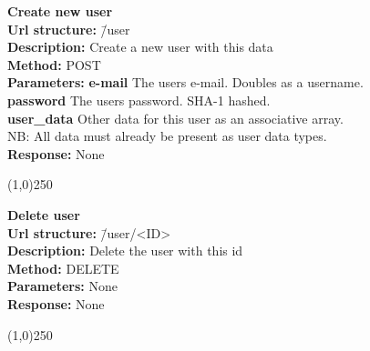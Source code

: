 \documentclass[11pt]{article}
\begin{document}
\begin{tabbing}
\textbf{Create new user} \\
\textcolor{black!60}{\textbf{Url structure:}} \hspace{0.2in} \= /user \\
\textcolor{black!60}{\textbf{Description:}}  \> Create a new user with this data \\
\textcolor{black!60}{\textbf{Method:}} \> POST \\
\textcolor{black!60}{\textbf{Parameters:}} \> \textbf{e-mail} The users e-mail. Doubles as a username. \\
\> \textbf{password} The users password. SHA-1 hashed. \\
\> \textbf{user\_data} Other data for this user as an associative array.\\ \> NB: All data must already be present as user data types. \\
\textcolor{black!60}{\textbf{Response:}} \> None
\end{tabbing}

\begin{center}\line(1,0){250}\end{center}

\begin{tabbing}
\textbf{Delete user} \\
\textcolor{black!60}{\textbf{Url structure:}} \hspace{0.2in} \= /user/<ID> \\
\textcolor{black!60}{\textbf{Description:}}  \> Delete the user with this id \\
\textcolor{black!60}{\textbf{Method:}} \> DELETE \\
\textcolor{black!60}{\textbf{Parameters:}} \> None \\
\textcolor{black!60}{\textbf{Response:}} \> None
\end{tabbing}

\begin{center}\line(1,0){250}\end{center}
\end{document}

